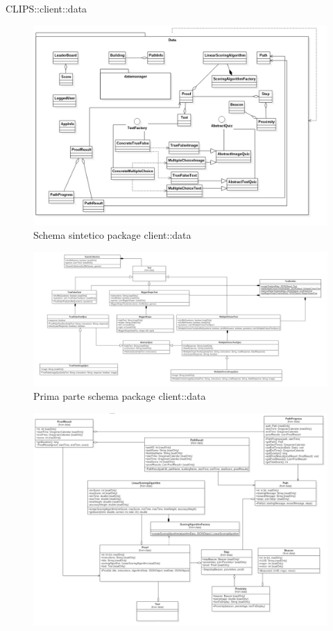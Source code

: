 \begin{componente}{CLIPS::client::data}
	\begin{figure}[h!]
		\centering
		\includegraphics[scale=0.35]{img/package/png/client--data--min.png}
		\caption{Schema sintetico package client::data}
	\end{figure}
\begin{figure}[h!]
	\centering
	\includegraphics[scale=0.35]{img/package/png/client--data1.png}
	\caption{Prima parte schema package client::data}
\end{figure}
\begin{figure}[h!]
	\centering
 \includegraphics[scale=0.35]{img/package/png/client--data2.png}

\end{figure}
\end{componente}
